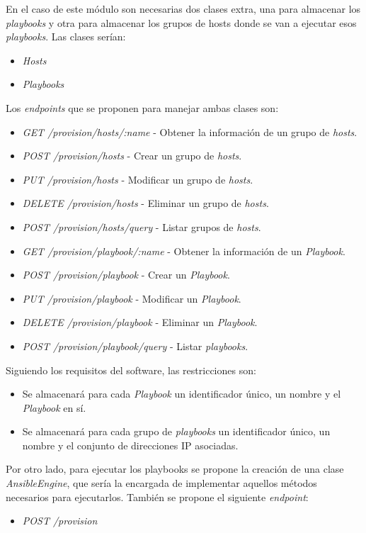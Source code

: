En el caso de este módulo son necesarias dos clases extra, una para almacenar los \textit{playbooks} y otra para almacenar los grupos de hosts donde se van a ejecutar esos \textit{playbooks}. Las clases serían:
\begin{itemize}
	\item \textit{Hosts}
	\item \textit{Playbooks}
\end{itemize}


\bigskip
Los \textit{endpoints} que se proponen para manejar ambas clases son:
\begin{itemize}
	\item \textit{GET /provision/hosts/:name} - Obtener la información de un grupo de \textit{hosts}.
	\item \textit{POST /provision/hosts} - Crear un grupo de \textit{hosts}.
	\item \textit{PUT /provision/hosts} - Modificar un grupo de \textit{hosts}.
	\item \textit{DELETE /provision/hosts} - Eliminar un grupo de \textit{hosts}.
	\item \textit{POST /provision/hosts/query} - Listar grupos de \textit{hosts}.
	\item \textit{GET /provision/playbook/:name} - Obtener la información de un \textit{Playbook}.
	\item \textit{POST /provision/playbook} - Crear un \textit{Playbook}.
	\item \textit{PUT /provision/playbook} - Modificar un \textit{Playbook}.
	\item \textit{DELETE /provision/playbook} - Eliminar un \textit{Playbook}.
	\item \textit{POST /provision/playbook/query} - Listar \textit{playbooks}.
\end{itemize}

\bigskip
Siguiendo los requisitos del software, las restricciones son:
\begin{itemize}
	\item Se almacenará para cada \textit{Playbook} un identificador único, un nombre y el \textit{Playbook} en sí.
	\item Se almacenará para cada grupo de \textit{playbooks} un identificador único, un nombre y el conjunto de direcciones IP asociadas.
\end{itemize}

\bigskip
Por otro lado, para ejecutar los playbooks se propone la creación de una clase \textit{AnsibleEngine}, que sería la encargada de implementar aquellos métodos necesarios para ejecutarlos. También se propone el siguiente \textit{endpoint}:
\begin{itemize}
	\item \textit{POST /provision}
\end{itemize}




